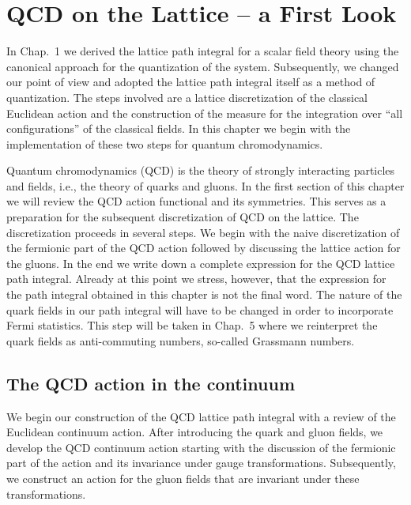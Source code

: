 
\chapter{QCD on the Lattice -- a First Look}

In Chap.~1 we derived the lattice path integral for a scalar field theory
using the canonical approach for the quantization of the system.
Subsequently, we changed our point of view and adopted the lattice path
integral itself as a method of quantization. The steps involved are a
lattice discretization of the classical Euclidean action and the
construction of the measure for the integration over ``all configurations''
of the classical fields. In this chapter we begin with the implementation of
these two steps for quantum chromodynamics.

Quantum chromodynamics (QCD) is the theory of strongly interacting particles
and fields, i.e., the theory of quarks and gluons. In the first section of
this chapter we will review the QCD action functional and its symmetries.
This serves as a preparation for the subsequent discretization of QCD on the
lattice. The discretization proceeds in several steps. We begin with the
naive discretization of the fermionic part of the QCD action followed by
discussing the lattice action for the gluons. In the end we write down a
complete expression for the QCD lattice path integral. Already at this point
we stress, however, that the expression for the path integral obtained in
this chapter is not the final word. The nature of the quark fields in our
path integral will have to be changed in order to incorporate Fermi
statistics. This step will be taken in Chap.~5 where we reinterpret the
quark fields as anti-commuting numbers, so-called Grassmann numbers.

\section{The QCD action in the continuum}

We begin our construction of the QCD lattice path integral with a review of
the Euclidean continuum action. After introducing the quark and gluon
fields, we develop the QCD continuum action starting with the discussion of
the fermionic part of the action and its invariance under gauge
transformations. Subsequently, we construct an action for the gluon fields
that are invariant under these transformations.

